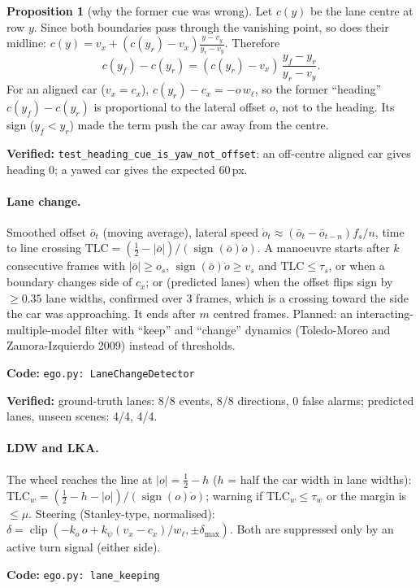\documentclass[10pt,a4paper]{article}
\newcommand{\code}[1]{\texttt{\small #1}}
\newcommand{\impl}[1]{\par\noindent\textcolor{blue!50!black}{\small\textbf{Code:} \texttt{#1}}\par}
\newcommand{\verif}[1]{\par\noindent\textcolor{green!35!black}{\small\textbf{Verified:} #1}\par}
\theoremstyle{definition}
\newtheorem{proposition}{Proposition}
\begin{document}
\begin{proposition}[why the former cue was wrong]
Let $c(y)$ be the lane centre at row $y$. Since both boundaries pass through the vanishing point, so does their
midline: $c(y)=v_x+(c(y_r)-v_x)\frac{y-v_y}{y_r-v_y}$. Therefore
\[c(y_f)-c(y_r)=(c(y_r)-v_x)\,\frac{y_f-y_r}{y_r-v_y}.\]
For an aligned car ($v_x=c_x$), $c(y_r)-c_x=-o\,w_\ell$, so the former ``heading'' $c(y_f)-c(y_r)$ is proportional to
the lateral offset $o$, not to the heading. Its sign ($y_f<y_r$) made the term push the car away from the centre.
\end{proposition}
\verif{\code{test\_heading\_cue\_is\_yaw\_not\_offset}: an off-centre aligned car gives heading 0; a yawed car gives the
expected 60\,px.}

\paragraph{Lane change.} Smoothed offset $\bar o_t$ (moving average), lateral speed
$\dot o_t\approx(\bar o_t-\bar o_{t-n})f_s/n$, time to line crossing $\mathrm{TLC}=(\tfrac12-|\bar o|)/(\operatorname{sign}(\bar o)\dot o)$.
A manoeuvre starts after $k$ consecutive frames with $|\bar o|\ge o_s$, $\operatorname{sign}(\bar o)\dot o\ge v_s$ and
$\mathrm{TLC}\le\tau_s$, or when a boundary changes side of $c_x$; or (predicted lanes) when the offset flips sign
by $\ge0.35$ lane widths, confirmed over 3 frames, which is a crossing toward the side the car was approaching. It
ends after $m$ centred frames. Planned: an interacting-multiple-model filter with ``keep'' and ``change''
dynamics (Toledo-Moreo and Zamora-Izquierdo 2009) instead of thresholds.
\impl{ego.py: LaneChangeDetector}
\verif{ground-truth lanes: 8/8 events, 8/8 directions, 0 false alarms; predicted lanes, unseen scenes: 4/4, 4/4.}

\paragraph{LDW and LKA.} The wheel reaches the line at $|o|=\tfrac12-h$ ($h$ = half the car width in lane widths):
$\mathrm{TLC}_w=(\tfrac12-h-|o|)/(\operatorname{sign}(o)\dot o)$; warning if $\mathrm{TLC}_w\le\tau_w$ or the margin is
$\le\mu$. Steering (Stanley-type, normalised): $\delta=\operatorname{clip}(-k_o\,o+k_\psi(v_x-c_x)/w_\ell,\pm\delta_{\max})$.
Both are suppressed only by an active turn signal (either side).
\impl{ego.py: lane\_keeping}

\end{document}
